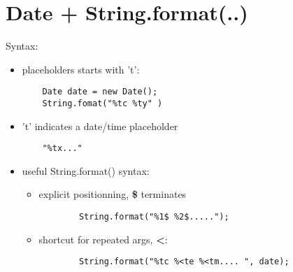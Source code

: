 \documentclass{report}
\begin{document}
\section{Date + String.format(..)}
Syntax:
\begin{itemize}
	\item placeholders starts with 't':
	\begin{verbatim}
	Date date = new Date();
	String.fomat("%tc %ty" )
	\end{verbatim}
	\item 't' indicates a date/time placeholder
	\begin{verbatim}
	"%tx..."
	\end{verbatim}
	\item useful String.format() syntax:
	\begin{itemize}
		\item explicit positionning, \textbf{\$} terminates
		\begin{verbatim}
		String.format("%1$ %2$.....");
		\end{verbatim}
		\item shortcut for repeated args, \textbf{\textless}:
		\begin{verbatim}
		String.format("%tc %<te %<tm.... ", date);
		\end{verbatim}
	\end{itemize}
\end{itemize}
\end{document}
